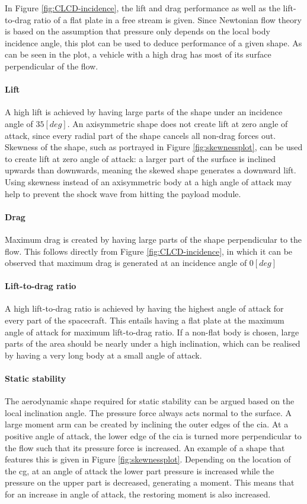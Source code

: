 In Figure \ref{fig:CLCD-incidence}, the lift and drag performance as well as the lift-to-drag ratio of a flat plate in a free stream is given. Since Newtonian flow theory is based on the assumption that pressure only depends on the local body incidence angle, this plot can be used to deduce performance of a given shape. As can be seen in the plot, a vehicle with a high drag has most of its surface perpendicular of the flow.

\paragraph{Lift}
A high lift is achieved by having large parts of the shape under an incidence angle of $35 \left[deg\right]$. An axisymmetric shape does not create lift at zero angle of attack, since every radial part of the shape cancels all non-drag forces out. Skewness of the shape, such as portrayed in Figure \ref{fig:skewnessplot}, can be used to create lift at zero angle of attack: a larger part of the surface is inclined upwards than downwards, meaning the skewed shape generates a downward lift. Using skewness instead of an axisymmetric body at a high angle of attack may help to prevent the shock wave from hitting the payload module.

\paragraph{Drag}
Maximum drag is created by having large parts of the shape perpendicular to the flow. This follows directly from Figure \ref{fig:CLCD-incidence}, in which it can be observed that maximum drag is generated at an incidence angle of $0 \left[deg\right]$

\paragraph{Lift-to-drag ratio}
A high lift-to-drag ratio is achieved by having the highest angle of attack for every part of the spacecraft. This entails having a flat plate at the maximum angle of attack for maximum lift-to-drag ratio. If a non-flat body is chosen, large parts of the area should be nearly under a high inclination, which can be realised by having a very long body at a small angle of attack.

\paragraph{Static stability}
The aerodynamic shape required for static stability can be argued based on the local inclination angle. The pressure force always acts normal to the surface. A large moment arm can be created by inclining the outer edges of the \gls{cia}. At a positive angle of attack, the lower edge of the \gls{cia} is turned more perpendicular to the flow such that its pressure force is increased. An example of a shape that features this is given in Figure \ref{fig:skewnessplot}. Depending on the location of the \acrfull{cg}, at an angle of attack the lower part pressure is increased while the pressure on the upper part is decreased, generating a moment. This means that for an increase in angle of attack, the restoring moment is also increased.

